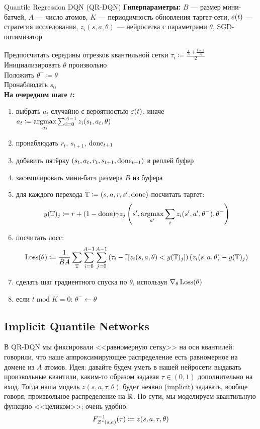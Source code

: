 \begin{algorithm}[label = QRDQNalgorithm]{Quantile Regression DQN (QR-DQN)}
\textbf{Гиперпараметры:} $B$ --- размер мини-батчей, $A$ --- число атомов, $K$ --- периодичность обновления таргет-сети, $\varepsilon(t)$ --- стратегия исследования, $z_i(s, a, \theta)$ --- нейросетка с параметрами $\theta$, SGD-оптимизатор

\vspace{0.3cm}
Предпосчитать середины отрезков квантильной сетки $\tau_i \coloneqq \frac{\frac{i}{A} + \frac{i+1}{A}}{2}$ \\
Инициализировать $\theta$ произвольно \\
Положить $\theta^- \coloneqq \theta$ \\
Пронаблюдать $s_0$ \\
\textbf{На очередном шаге $t$:}
\begin{enumerate}
    \item выбрать $a_t$ случайно с вероятностью $\varepsilon(t)$, иначе $a_t \coloneqq \mathop{\mathrm{argmax}}\limits_{a_t} \sum_{i=0}^{A-1} z_i(s_t, a_t, \theta)$
    \item пронаблюдать $r_t$,  $s_{t+1}$, $\mathrm{done}_{t+1}$
    \item добавить пятёрку $(s_t, a_t, r_t, s_{t+1}, \mathrm{done}_{t+1})$ в реплей буфер
    \item засэмплировать мини-батч размера $B$ из буфера
    \item для каждого перехода $\mathbb{T} \coloneqq (s, a, r, s', \mathrm{done})$ посчитать таргет:
    $$y(\mathbb{T})_j \coloneqq r + (1 - \mathrm{done})\gamma z_j\left( s', \mathop{\mathrm{argmax}}\limits_{a'} \sum_{i} z_i(s', a', \theta^-), \theta^- \right) $$
    \item посчитать лосс:
    $$\operatorname{Loss}(\theta) \coloneqq \frac{1}{BA}\sum_{\mathbb{T}} \sum_{i=0}^{A-1} \sum_{j=0}^{A-1} \left( \tau_i - \mathbb{I}[z_i(s, a, \theta) < y(\mathbb{T})_j] \right) \left( z_i(s, a, \theta) - y(\mathbb{T})_j \right)$$
    \item сделать шаг градиентного спуска по $\theta$, используя $\nabla_\theta \operatorname{Loss}(\theta)$
    \item если $t \operatorname{mod} K = 0$: $\theta^- \gets \theta$
\end{enumerate}
\end{algorithm}

\subsection{Implicit Quantile Networks}\label{subsec:iqn}

В QR-DQN мы фиксировали <<равномерную сетку>> на оси квантилей: говорили, что наше аппроксимирующее распределение есть равномерное на домене из $A$ атомов. Идея: давайте будем уметь в нашей нейросети выдавать произвольные квантили, каким-то образом задавая $\tau \in (0, 1)$ дополнительно на вход. Тогда наша модель $z(s, a, \tau, \theta)$ будет неявно (implicit) задавать, вообще говоря, произвольное распределение на $\mathbb{R}$. По сути, мы моделируем квантильную функцию <<целиком>>; очень удобно:
$$F^{-1}_{\mathcal{Z}^*(s, a)}(\tau) \coloneqq z(s, a, \tau, \theta)$$

